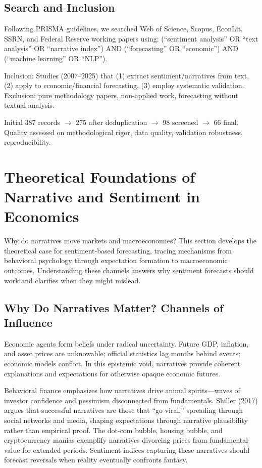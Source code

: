 \documentclass[11pt]{article}
\begin{document}
\subsection{Search and Inclusion}

Following PRISMA guidelines, we searched Web of Science, Scopus, EconLit, SSRN, and Federal Reserve working papers using: (``sentiment analysis'' OR ``text analysis'' OR ``narrative index'') AND (``forecasting'' OR ``economic'') AND (``machine learning'' OR ``NLP''). 

Inclusion: Studies (2007--2025) that (1) extract sentiment/narratives from text, (2) apply to economic/financial forecasting, (3) employ systematic validation. Exclusion: pure methodology papers, non-applied work, forecasting without textual analysis.

Initial 387 records $\to$ 275 after deduplication $\to$ 98 screened $\to$ 66 final. Quality assessed on methodological rigor, data quality, validation robustness, reproducibility.

\newpage
\section{Theoretical Foundations of Narrative and Sentiment in Economics}

Why do narratives move markets and macroeconomies? This section develops the theoretical case for sentiment-based forecasting, tracing mechanisms from behavioral psychology through expectation formation to macroeconomic outcomes. Understanding these channels answers why sentiment forecasts should work and clarifies when they might mislead.

\subsection{Why Do Narratives Matter? Channels of Influence}

Economic agents form beliefs under radical uncertainty. Future GDP, inflation, and asset prices are unknowable; official statistics lag months behind events; economic models conflict. In this epistemic void, narratives provide coherent explanations and expectations for otherwise opaque economic futures.

Behavioral finance emphasizes how narratives drive animal spirits---waves of investor confidence and pessimism disconnected from fundamentals. Shiller (2017) argues that successful narratives are those that ``go viral,'' spreading through social networks and media, shaping expectations through narrative plausibility rather than empirical proof. The dot-com bubble, housing bubble, and cryptocurrency manias exemplify narratives divorcing prices from fundamental value for extended periods. Sentiment indices capturing these narratives should forecast reversals when reality eventually confronts fantasy.
\end{document}
